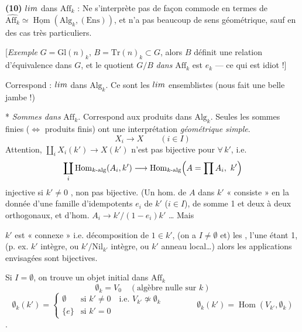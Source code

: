 \documentclass[11pt,a4paper]{article}
\begin{document}
\textbf{(10)} $\varinjlim$ dans $\mathrm{Aff}_k$ : Ne s'interprète pas de façon commode
en termes de $\widehat{\mathrm{Aff}_k} \simeq \underline{\operatorname{Hom}}(\mathrm{Alg}_k, (\mathrm{Ens}))$, et n'a pas beaucoup de sens géométrique, sauf en des cas très particuliers.

[\emph{Exemple} \quad $G = \mathrm{Gl}(n)_k$, $B = \mathrm{Tr}(n)_k \subset G$, alors $B$ définit une relation d'équivalence dans $G$, et le quotient $G/B$ \emph{dans} $\mathrm{Aff}_k$ est $e_k$ --- ce qui est idiot !]

Correspond : $\varprojlim$ dans $\mathrm{Alg}_k$. Ce sont les $\varprojlim$ ensemblistes (nous fait une belle jambe !)

* \emph{Sommes dans} $\mathrm{Aff}_k$. Correspond aux produits dans
$\mathrm{Alg}_k$. Seules les sommes finies ($\Longleftrightarrow$ produits finis) ont une interprétation \emph{géométrique simple}.
\[
X_i \longrightarrow X \qquad (i \in I)
\]
Attention, $\coprod_i X_i(k') \to X(k')$ n'est pas bijective pour $\forall\, k'$, i.e.
\[
\coprod_i \operatorname{Hom}_{k\text{-alg}}(A_i, k') \longrightarrow \operatorname{Hom}_{k\text{-alg}}\Bigl(A = \prod A_i,\ k'\Bigr)
\]
 injective si $k' \neq 0$ \struck{\ill{}}, non pas bijective. (Un hom. de $A$ dans $k'$ « consiste » en la donnée d'une famille d'idempotents $e_i$ de $k'$ ($i \in I$), de somme 1 et deux à deux orthogonaux, et d'hom. $A_i \to k' / (1 - e_i) k'$ … Mais

$k'$ est « connexe » i.e.   décomposition de $1 \in k'$, (on a $I \neq \emptyset$ et)  les , l'une étant 1, \struck{\ill{}} (p. ex. $k'$ intègre, \struck{\ill{}} ou $k'/\mathrm{Nil}_{k'}$ intègre, \struck{\ill{}} ou  $k'$ anneau local…) alors les applications envisagées sont bijectives.

Si $I = \emptyset$, on trouve un objet initial dans $\mathrm{Aff}_k$
\[
\emptyset_k = V_0 \quad (\text{algèbre nulle sur } k)
\]
\[
\emptyset_k(k') =
\begin{cases}
\emptyset & \text{si } k' \neq 0 \quad \text{i.e. } V_{k'} \not\simeq \emptyset_k \\
\{e\} & \text{si } k' = 0
\end{cases}
\qquad\qquad \emptyset_k(k') = \operatorname{Hom}(V_{k'}, \emptyset_k)
\]
. \struck{\ill{}}
\end{document}
